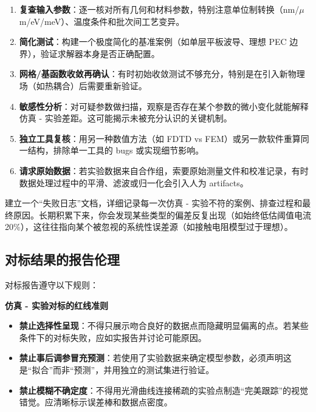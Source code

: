 \begin{enumerate}
  \item \textbf{复查输入参数}：逐一核对所有几何和材料参数，特别注意单位制转换（nm/$\mu$m/eV/meV）、温度条件和批次间工艺变异。
  
  \item \textbf{简化测试}：构建一个极度简化的基准案例（如单层平板波导、理想 PEC 边界），验证求解器本身是否正确配置。
  
  \item \textbf{网格/基函数收敛再确认}：有时初始收敛测试不够充分，特别是在引入新物理场（如热耦合）后需要重新验证。
  
  \item \textbf{敏感性分析}：对可疑参数做扫描，观察是否存在某个参数的微小变化就能解释仿真 - 实验差距。这可能揭示未被充分认识的关键机制。
  
  \item \textbf{独立工具复核}：用另一种数值方法（如 FDTD vs FEM）或另一款软件重算同一结构，排除单一工具的 bugs 或实现细节影响。
  
  \item \textbf{请求原始数据}：若实验数据来自合作组，索要原始测量文件和校准记录，有时数据处理过程中的平滑、滤波或归一化会引入人为 artifacts。
\end{enumerate}

建立一个“失败日志”文档，详细记录每一次仿真 - 实验不符的案例、排查过程和最终原因。长期积累下来，你会发现某些类型的偏差反复出现（如始终低估阈值电流 20\%），这往往指向某个被忽视的系统性误差源（如接触电阻模型过于理想）。

\subsection{对标结果的报告伦理}
对标报告遵守以下规则：

\begin{EthicsReminderBox}
\textbf{仿真 - 实验对标的红线准则}
\begin{itemize}
  \item \textbf{禁止选择性呈现}：不得只展示吻合良好的数据点而隐藏明显偏离的点。若某些条件下的对标失败，应如实报告并讨论可能原因。
  
  \item \textbf{禁止事后调参冒充预测}：若使用了实验数据来确定模型参数，必须声明这是“拟合”而非“预测”，并用独立的测试集进行验证。
  
  \item \textbf{禁止模糊不确定度}：不得用光滑曲线连接稀疏的实验点制造“完美跟踪”的视觉错觉。应清晰标示误差棒和数据点密度。
\end{itemize}
\end{EthicsReminderBox}


